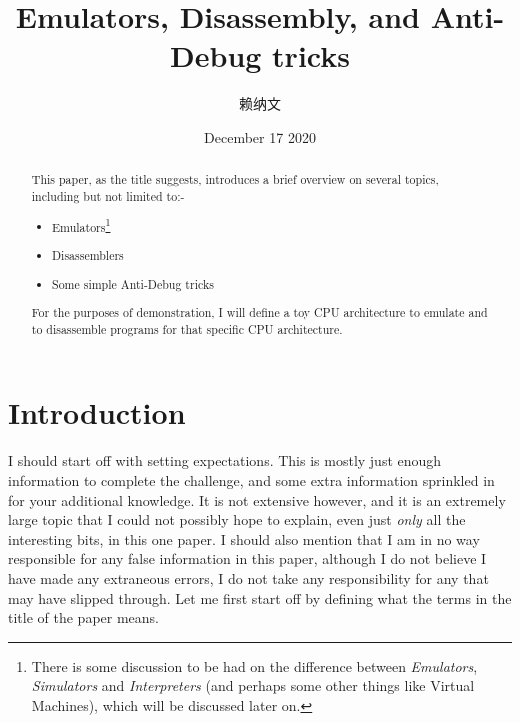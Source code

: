 \documentclass[twocolumn, a4paper,12pt]{article}
\title{Emulators, Disassembly, and Anti-Debug tricks}
\author{\cjkfont 赖纳文}
\date{December 17 2020}
\begin{document}
\maketitle

\begin{abstract}
This paper, as the title suggests, introduces a brief overview on several topics, including but not limited to:-
\begin{itemize}
 \item Emulators\footnote{There is some discussion to be had on the difference between \textit{Emulators},
 \textit{Simulators} and \textit{Interpreters} (and perhaps some other things like Virtual Machines), 
 which will be discussed later on.}
 \item Disassemblers
 \item Some simple Anti-Debug tricks
\end{itemize}
For the purposes of demonstration, I will define a toy CPU architecture to emulate and to
disassemble programs for that specific CPU architecture.
\end{abstract}

\section{Introduction}
I should start off with setting expectations. This is mostly just enough information to complete the challenge, and
some extra information sprinkled in for your additional knowledge. It is not extensive however, and it is an extremely large
topic that I could not possibly hope to explain, even just \textit{only} all the interesting bits, in this one paper. I should
also mention that I am in no way responsible for any false information in this paper, although I do not believe I have made
any extraneous errors, I do not take any responsibility for any that may have slipped through.
Let me first start off by defining what the terms in the title of the paper means.
\end{document}
